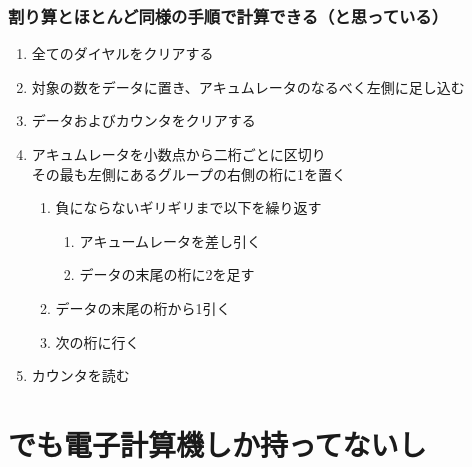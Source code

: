 \documentclass[
  lualatex,
  aspectratio=169,
  fleqn,
  14pt
]{beamer}
\begin{document}
\begin{frame}
  \frametitle{割り算とほとんど同様の手順で計算できる（と思っている）}

  \begin{small}
    \begin{enumerate}
      \setlength{\itemsep}{0pt}
        \setlength{\parsep}{0pt}
        \setlength{\topsep}{0pt}
      \item
        全てのダイヤルをクリアする
      \item
        対象の数をデータに置き、アキュムレータのなるべく左側に足し込む
      \item
        データおよびカウンタをクリアする
      \item
        アキュムレータを小数点から二桁ごとに区切り\\
        \hspace{2.5\zw}その最も左側にあるグループの右側の桁に1を置く
        \begin{small}
          \begin{enumerate}
            \item
              負にならないギリギリまで以下を繰り返す
              \begin{enumerate}
              \item
                アキュームレータを差し引く
              \item
                データの末尾の桁に2を足す
              \end{enumerate}
              \item
                データの末尾の桁から1引く
              \item
                次の桁に行く
          \end{enumerate}
        \end{small}
      \item
        カウンタを読む
    \end{enumerate}
  \end{small}

\end{frame}

\section{でも電子計算機しか持ってないし}
\end{document}
